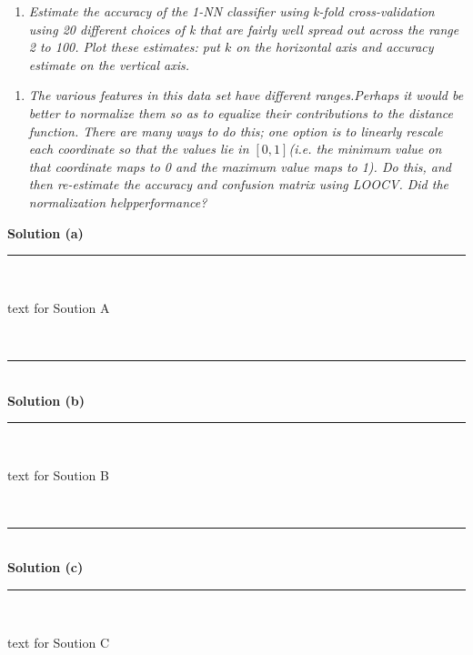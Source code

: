 \documentclass{article}
\begin{document}
\begin{enumerate}[label=(b)]
  \item \textit{Estimate the accuracy of the 1-NN classifier using k-fold cross-validation using 20 different choices
of k that are fairly well spread out across the range 2 to 100. Plot these estimates: put $k$ on the
horizontal axis and accuracy estimate on the vertical axis.}
\end{enumerate}

\begin{enumerate}[label=(c)]
  \item \textit{The various features in this data set have different ranges.Perhaps it would be better to normalize them so as to equalize their contributions to the distance function. There are many ways to do this; one option is to linearly rescale each coordinate so that the values lie in $[0,1]$(i.e. the minimum value on that coordinate maps to 0 and the maximum value maps to 1). Do this, and then re-estimate the accuracy and confusion matrix using LOOCV. Did the normalization helpperformance?}
\end{enumerate}

\textbf{Solution (a)}

\noindent\rule{\textwidth}{0.4pt}\\

\parbox{\textwidth}{text for Soution A}\\

\noindent\rule{\textwidth}{0.4pt}\\

\textbf{Solution (b)}

\noindent\rule{\textwidth}{0.4pt}\\

\parbox{\textwidth}{text for Soution B}\\

\noindent\rule{\textwidth}{0.4pt}\\

\textbf{Solution (c)}

\noindent\rule{\textwidth}{0.4pt}\\

\parbox{\textwidth}{text for Soution C}
\end{document}
